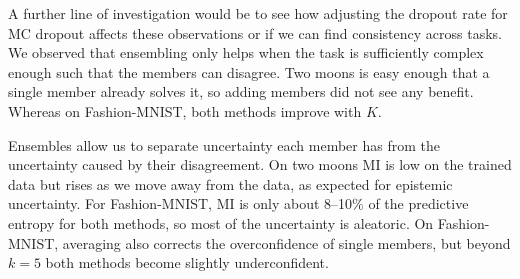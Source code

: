\documentclass[10pt]{article}
\begin{document}
  A further line of investigation would be to see how adjusting the dropout rate for MC dropout affects these observations or if we can find consistency across tasks.
  We observed that ensembling only helps when the task is sufficiently complex enough such that the members can disagree.
  Two moons is easy enough that a single member already solves it, so adding members did not see any benefit.
  Whereas on Fashion-MNIST, both methods improve with $K$.

  Ensembles allow us to separate uncertainty each member has from the uncertainty caused by their disagreement.
  On two moons MI is low on the trained data but rises as we move away from the data, as expected for epistemic uncertainty.
  For Fashion-MNIST, MI is only about 8--10\% of the predictive entropy for both methods, so most of the uncertainty is aleatoric.
  On Fashion-MNIST, averaging also corrects the overconfidence of single members, but beyond $k=5$ both methods become slightly underconfident.
\end{document}

